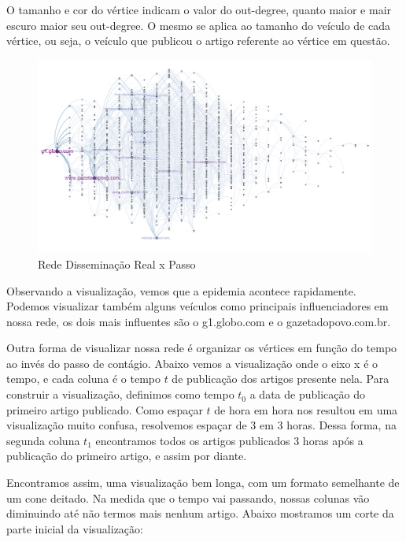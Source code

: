 \documentclass[a4paper,12pt]{article}
\begin{document}
O tamanho e cor do vértice indicam o valor do out-degree, quanto maior e mair escuro maior seu out-degree. O mesmo se aplica ao tamanho
do veículo de cada vértice, ou seja, o veículo que publicou o artigo referente ao vértice em questão.

\begin{flushleft}
  \begin{figure}[ht]
  \includegraphics[scale=0.5]{../results/a.png}
  \caption{Rede Disseminação Real x Passo}
  \end{figure}
\end{flushleft}
\pagebreak

Observando a visualização, vemos que a epidemia acontece rapidamente. Podemos visualizar também alguns veículos como principais influenciadores
em nossa rede, os dois mais influentes são o g1.globo.com e o gazetadopovo.com.br.

Outra forma de visualizar nossa rede é organizar os vértices em função do tempo ao invés do passo de contágio. Abaixo vemos a visualização
onde o eixo x é o tempo, e cada coluna é o tempo $t$ de publicação dos artigos presente nela. Para construir a visualização, definimos
como tempo $t_{0}$ a data de publicação do primeiro artigo publicado. Como espaçar $t$ de hora em hora nos resultou em uma visualização muito confusa,
 resolvemos espaçar de 3 em 3 horas. Dessa forma, na segunda coluna $t_{1}$ encontramos todos os artigos publicados 3 horas após a publicação
 do primeiro artigo, e assim por diante.

Encontramos assim, uma visualização bem longa, com um formato semelhante de um cone deitado. Na medida que o tempo vai passando, nossas
colunas vão diminuindo até não termos mais nenhum artigo. Abaixo mostramos um corte da parte inicial da visualização:
\end{document}
